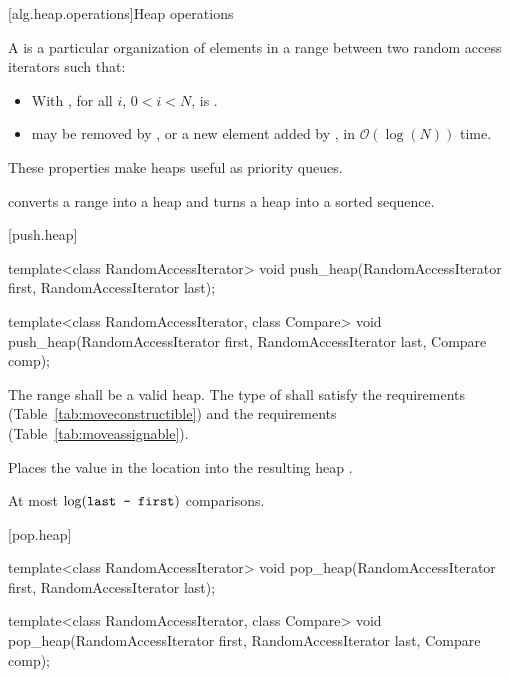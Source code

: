 [alg.heap.operations]{Heap operations}

\pnum
A
is a particular organization of elements in a range between two random access iterators
 such that:

\begin{itemize}
\item With , for all $i$, $0 < i < N$,
is .
\item {}
may be removed by
,
or a new element added by
,
in
$\mathcal{O}(\log(N))$
time.
\end{itemize}

\pnum
These properties make heaps useful as priority queues.

\pnum
{}
converts a range into a heap and
turns a heap into a sorted sequence.

[push.heap]{}

%
\begin{itemdecl}
template<class RandomAccessIterator>
  void push_heap(RandomAccessIterator first, RandomAccessIterator last);

template<class RandomAccessIterator, class Compare>
  void push_heap(RandomAccessIterator first, RandomAccessIterator last,
                 Compare comp);
\end{itemdecl}

\begin{itemdescr}
\pnum
\requires
The range
shall be a valid heap.
The type of  shall satisfy
the  requirements
(Table~\ref{tab:moveconstructible}) and the
 requirements
(Table~\ref{tab:moveassignable}).

\pnum
\effects
Places the value in the location
into the resulting heap
.

\pnum
\complexity
At most
$\log(\texttt{last - first})$
comparisons.
\end{itemdescr}

[pop.heap]{}

%
\begin{itemdecl}
template<class RandomAccessIterator>
  void pop_heap(RandomAccessIterator first, RandomAccessIterator last);

template<class RandomAccessIterator, class Compare>
  void pop_heap(RandomAccessIterator first, RandomAccessIterator last,
                Compare comp);
\end{itemdecl}

